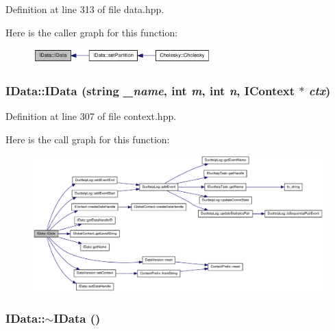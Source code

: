 Definition at line 313 of file data.hpp.

Here is the caller graph for this function:\nopagebreak
\begin{figure}[H]
\begin{center}
\leavevmode
\includegraphics[width=195pt]{class_i_data_a75fd2d8c81d6a34679ebc3222d8339a2_icgraph}
\end{center}
\end{figure}
\hypertarget{class_i_data_a7f41e876d5c6c19e5b77ca480b3978b3}{
\subsubsection[{IData}]{\setlength{\rightskip}{0pt plus 5cm}IData::IData (string {\em \_\-name}, \/  int {\em m}, \/  int {\em n}, \/  {\bf IContext} $\ast$ {\em ctx})}}
\label{class_i_data_a7f41e876d5c6c19e5b77ca480b3978b3}


Definition at line 307 of file context.hpp.

Here is the call graph for this function:\nopagebreak
\begin{figure}[H]
\begin{center}
\leavevmode
\includegraphics[width=420pt]{class_i_data_a7f41e876d5c6c19e5b77ca480b3978b3_cgraph}
\end{center}
\end{figure}
\hypertarget{class_i_data_a30ce868ac52a0fc576606b9c98da125f}{
\subsubsection[{$\sim$IData}]{\setlength{\rightskip}{0pt plus 5cm}IData::$\sim$IData ()}}
\label{class_i_data_a30ce868ac52a0fc576606b9c98da125f}



